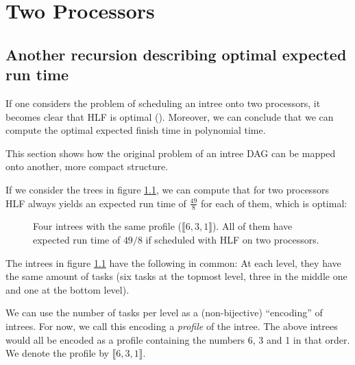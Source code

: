 \chapter{Two Processors}
\label{chap:p2}

\section{Another recursion describing optimal expected run time}
\label{sec:p2-simple-method-for-runtime}

\newcommand{\profile}[1]{\llbracket #1 \rrbracket}

If one considers the problem of scheduling an intree onto two processors, it becomes clear that HLF is optimal (). Moreover, we can conclude that we can compute the optimal expected finish time in polynomial time.

This section shows how the original problem of an intree DAG can be mapped onto another, more compact structure.

If we consider the trees in figure \ref{fig:p2-four-intrees-with-same-profile-6-3-1}, we can compute that for two processors HLF always yields an expected run time of $\frac{49}{8}$ for each of them, which is optimal:

\begin{figure}[ht]
  \centering
  \hspace{0.5cm}
  \hspace{0.5cm}
  \hspace{0.5cm}
  
  \caption{Four intrees with the same profile ($\profile{6,3,1}$). All of them have expected run time of $49/8$ if scheduled with HLF on two processors.}
  \label{fig:p2-four-intrees-with-same-profile-6-3-1}
\end{figure}

The intrees in figure \ref{fig:p2-four-intrees-with-same-profile-6-3-1} have the following in common: At each level, they have the same amount of tasks (six tasks at the topmost level, three in the middle one and one at the bottom level).

We can use the number of tasks per level as a (non-bijective) ``encoding'' of intrees. For now, we call this encoding a \emph{profile} of the intree. The above intrees would all be encoded as a profile containing the numbers 6, 3 and 1 in that order. We denote the profile by $\llbracket 6, 3, 1 \rrbracket$.

